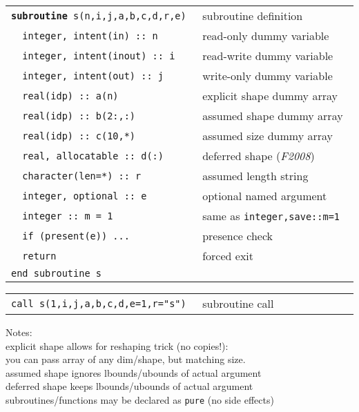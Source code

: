 \documentclass[8pt]{extarticle} %
\begin{document}
\begin{multicols}{3}
  \begin{tabular}{L{0.55\linewidth} L{0.45\linewidth}}
  \tt \textbf{subroutine}~s(n,i,j,a,b,c,d,r,e)   &  subroutine definition        \\
  \tt ~~integer,~intent(in)~::~n                 &  read-only dummy variable     \\
  \tt ~~integer,~intent(inout)~::~i              &  read-write dummy variable    \\
  \tt ~~integer,~intent(out)~::~j                &  write-only dummy variable    \\
  \tt ~~real(idp)~::~a(n)                        &  explicit shape dummy array   \\
  \tt ~~real(idp) ::~b(2:,:)                     &  assumed shape dummy array    \\
  \tt ~~real(idp) ::~c(10,*)                     &  assumed size dummy array     \\
  \tt ~~real,~allocatable~::~d(:)                &  deferred shape (\textit{F2008}) \\
  \tt ~~character(len=*)~::~r                    &  assumed length string        \\
  \tt ~~integer,~optional~::~e                   &  optional named argument      \\
  \tt ~~integer~::~m~=~1                         &  same as {\tt integer,save::m=1} \\
  \tt ~~if~(present(e))~...                      &  presence check               \\
  \tt ~~return                                   &  forced exit                  \\
  \tt end~subroutine~s                           &
  \end{tabular}
  \begin{tabular}{L{0.55\linewidth} L{0.45\linewidth}}
  \tt call~s(1,i,j,a,b,c,d,e=1,r="s")     & subroutine call
  \end{tabular}
  Notes:\\
  \textbullet{} explicit shape allows for reshaping trick (no copies!):\\
  \hspace*{1em}you can pass array of any dim/shape, but matching size.\\
  \textbullet{} assumed shape ignores lbounds/ubounds of actual argument \\
  \textbullet{} deferred shape keeps lbounds/ubounds of actual argument \\
  \textbullet{} subroutines/functions may be declared as {\tt pure} (no side effects)


\end{multicols}
\end{document}
